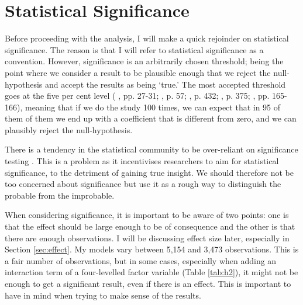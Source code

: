 \section{Statistical Significance}
Before proceeding with the analysis, I will make a quick rejoinder on statistical significance. The reason is that I will refer to statistical significance as a convention. However, significance is an arbitrarily chosen threshold; being the point where we consider a result to be plausible enough that we reject the null-hypothesis and accept the results as being `true.' The most accepted threshold goes at the five per cent level (\citeauthor{christophersen_introduksjon_2018} \citeyear{christophersen_introduksjon_2018}, pp. 27-31; \citeauthor{gelman_regression_2021} \citeauthor{gelman_regression_2021}, p. 57; \citeauthor{halperin_political_2020} \citeyear{halperin_political_2020},  p. 432; \citeauthor{hellevik_forskningsmetode_2002} \citeyear{hellevik_forskningsmetode_2002}, p. 375; \citeauthor{kellstedt_fundamentals_2018} \citeyear{kellstedt_fundamentals_2018}, pp. 165-166), meaning that if we do the study 100 times, we can expect that in 95 of them of them we end up with a coefficient that is different from zero, and we can plausibly reject the null-hypothesis.

There is a tendency in the statistical community to be over-reliant on significance testing \citep{barnett_examination_2019, gelman_regression_2021, imbens_statistical_2021, van_zwet_significance_2021}. This is a problem as it incentivises researchers to aim for statistical significance, to the detriment of gaining true insight. We should therefore not be too concerned about significance but use it as a rough way to distinguish the probable from the improbable.

When considering significance, it is important to be aware of two points: one is that the effect should be large enough to be of consequence and the other is that there are enough observations. I will be discussing effect size later, especially in Section \ref{sec:effect}. My models vary between 5,154 and 3,473 observations. This is a fair number of observations, but in some cases, especially when adding an interaction term of a four-levelled factor variable (Table \ref{tab:h2}), it might not be enough to get a significant result, even if there is an effect. This is important to have in mind when trying to make sense of the results.

